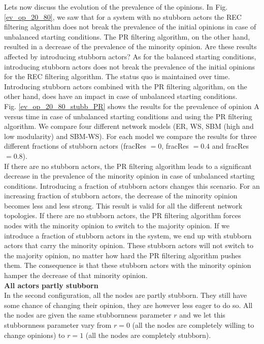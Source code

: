 \documentclass[11 pt , letterpaper , twoside , openright]{book}
\begin{document}
\noindent
Lets now discuss the evolution of the prevalence of the opinions. In Fig. \ref{ev_op_20_80}, we saw that for a system with no stubborn actors the REC filtering algorithm does not break the prevalence of the initial opinions in case of unbalanced starting conditions. The PR filtering algorithm, on the other hand, resulted in a decrease of the prevalence of the minority opinion. Are these results affected by introducing stubborn actors? As for the balanced starting conditions, introducing stubborn actors does not break the prevalence of the initial opinions for the REC filtering algorithm. The status quo is maintained over time. Introducing stubborn actors combined with the PR filtering algorithm, on the other hand, does have an impact in case of unbalanced starting conditions.\\
\newline
Fig. \ref{ev_op_20_80_stubb_PR} shows the results for the prevalence of opinion A versus time in case of unbalanced starting conditions and using the PR filtering algorithm. We compare four different network models (ER, WS, SBM (high and low modularity) and SBM-WS). For each model we compare the results for three different fractions of stubborn actors (fracRes $=0$, fracRes $=0.4$ and fracRes $=0.8$). \\
\newline
If there are no stubborn actors, the PR filtering algorithm leads to a significant decrease in the prevalence of the minority opinion in case of unbalanced starting conditions. Introducing a fraction of stubborn actors changes this scenario. For an increasing fraction of stubborn actors, the decrease of the minority opinion becomes less and less strong. This result is valid for all the different network topologies. If there are no stubborn actors, the PR filtering algorithm forces nodes with the minority opinion to switch to the majority opinion. If we introduce a fraction of stubborn actors in the system, we end up with stubborn actors that carry the minority opinion. These stubborn actors will not switch to the majority opinion, no matter how hard the PR filtering algorithm pushes them. The consequence is that these stubborn actors with the minority opinion hamper the decrease of that minority opinion. \\
\newline
\textbf{All actors partly stubborn}\\
\newline
In the second configuration, all the nodes are partly stubborn. They still have some chance of changing their opinion, they are however less eager to do so. All the nodes are given the same stubbornness parameter $r$ and we let this stubbornness parameter vary from $r = 0$ (all the nodes are completely willing to change opinions) to $r=1$ (all the nodes are completely stubborn).\\
\end{document}
